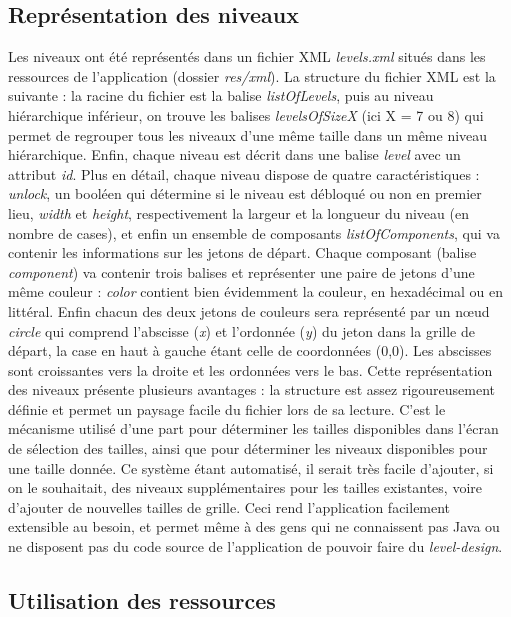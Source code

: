 \documentclass[12pt, a4paper]{article}%
\begin{document}
    \subsection{Représentation des niveaux}
    Les niveaux ont été représentés dans un fichier XML \textit{levels.xml} situés dans les ressources de l'application (dossier \textit{res/xml}). La structure du fichier XML est la suivante : la racine du fichier est la balise \textit{listOfLevels}, puis au niveau hiérarchique inférieur, on trouve les balises \textit{levelsOfSizeX} (ici X = 7 ou 8) qui permet de regrouper tous les niveaux d'une même taille dans un même niveau hiérarchique. Enfin, chaque niveau est décrit dans une balise \textit{level} avec un attribut \textit{id}.
    \newline
    Plus en détail, chaque niveau dispose de quatre caractéristiques : \textit{unlock}, un booléen qui détermine si le niveau est débloqué ou non en premier lieu, \textit{width} et \textit{height}, respectivement la largeur et la longueur du niveau (en nombre de cases), et enfin un ensemble de composants \textit{listOfComponents}, qui va contenir les informations sur les jetons de départ. Chaque composant (balise \textit{component}) va contenir trois balises et représenter une paire de jetons d'une même couleur : \textit{color} contient bien évidemment la couleur, en hexadécimal ou en littéral. Enfin chacun des deux jetons de couleurs sera représenté par un nœud \textit{circle} qui comprend l'abscisse (\textit{x}) et l'ordonnée (\textit{y}) du jeton dans la grille de départ, la case en haut à gauche étant celle de coordonnées (0,0). Les abscisses sont croissantes vers la droite et les ordonnées vers le bas.
    \newline
    Cette représentation des niveaux présente plusieurs avantages : la structure est assez rigoureusement définie et permet un paysage facile du fichier lors de sa lecture. C'est le mécanisme utilisé d'une part pour déterminer les tailles disponibles dans l'écran de sélection des tailles, ainsi que pour déterminer les niveaux disponibles pour une taille donnée. Ce système étant automatisé, il serait très facile d'ajouter, si on le souhaitait, des niveaux supplémentaires pour les tailles existantes, voire d'ajouter de nouvelles tailles de grille. Ceci rend l'application facilement extensible au besoin, et permet même à des gens qui ne connaissent pas Java ou ne disposent pas du code source de l'application de pouvoir faire du \textit{level-design}.
    
    \subsection{Utilisation des ressources}
\end{document}
